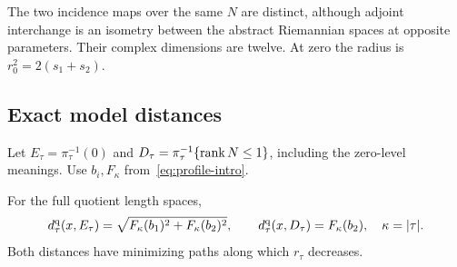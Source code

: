 The two incidence maps over the same $N$ are distinct, although adjoint
interchange is an isometry between the abstract Riemannian spaces at
opposite parameters. Their complex dimensions are twelve. At zero
the radius is $r_0^2=2(s_1+s_2)$.

\subsection{Exact model distances}

Let $E_\tau=\pi_\tau^{-1}(0)$ and
$D_\tau=\pi_\tau^{-1}\{\operatorname{rank} N\le1\}$, including the zero-level meanings.
Use $b_i,F_\kappa$ from~\eqref{eq:profile-intro}.

\begin{proposition}\label{prop:model-distances}
For the full quotient length spaces,
\begin{equation}\label{eq:model-distances}
d_\tau^{\rm q}(x,E_\tau)
=\sqrt{F_\kappa(b_1)^2+F_\kappa(b_2)^2},\qquad
d_\tau^{\rm q}(x,D_\tau)=F_\kappa(b_2),\quad \kappa=|\tau|.
\end{equation}
Both distances have minimizing paths along which $r_\tau$ decreases.
\end{proposition}

